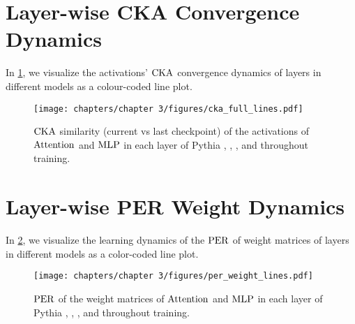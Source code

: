 \begin{table}[!t]
    \centering
    
    \caption{Details on the architecture and training hyper-parameters for models in the Pythia suite used in this paper.}
    \label{tab:model_hparams}
\end{table}

\clearpage

\section{Layer-wise CKA Convergence Dynamics}
\label{app:layerwise-convergence-figures}

In \cref{fig:cka-layer-wise-lines}, we visualize the activations' $\mathrm{CKA}$ convergence dynamics of layers in different models as a colour-coded line plot.
\vspace{0.2cm}

\begin{figure*}[h!]
    \centering
    \texttt{[image: chapters/chapter 3/figures/cka\_full\_lines.pdf]}
    \vspace{-5pt}
    \caption{$\mathrm{CKA}$ similarity (current vs last checkpoint) of the activations of $\mathrm{Attention}$ and $\mathrm{MLP}$ in each layer of Pythia , , ,  and  throughout training.}%
    \label{fig:cka-layer-wise-lines}
\end{figure*}

\section{Layer-wise PER Weight Dynamics}
\label{app:layerwise-per_weight-figures}

In \cref{fig:per_weight-layer-wise-lines}, we visualize the learning dynamics of the $\mathrm{PER}$ of weight matrices of layers in different models as a color-coded line plot. 
\vspace{0.2cm}

\begin{figure*}[h!]
    \centering
    \texttt{[image: chapters/chapter 3/figures/per\_weight\_lines.pdf]}
    \vspace{-5pt}
    \caption{$\mathrm{PER}$ of the weight matrices of $\mathrm{Attention}$ and $\mathrm{MLP}$ in each layer of Pythia , , ,  and  throughout training.}%
    \label{fig:per_weight-layer-wise-lines}
\end{figure*}


